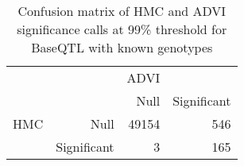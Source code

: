 \begin{table}[ht]
\centering
\caption{Confusion matrix of HMC and ADVI significance calls at 99\% threshold for BaseQTL with known genotypes} 
\label{tab:gt-xtab-99}
\begin{tabular}{rr|rr}
   &  & ADVI &  \\ 
    &   & Null & Significant \\ 
   \hline
HMC & Null & 49154 & 546 \\ 
    & Significant & 3 & 165 \\ 
  \end{tabular}
\end{table}
